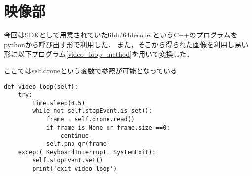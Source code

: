 \section{映像部}
\label{implement_video}
今回はSDK\cite{tellosdk}として用意されていたlibh264decoderというC++のプログラムをpythonから呼び出す形で利用した．
また，そこから得られた画像を利用し易い形に以下プログラム\ref{video_loop_method}を用いて変換した．

ここではself.droneという変数で参照が可能となっている
\begin{lstlisting}[caption=video loop method,label=video_loop_method]
def video_loop(self):
    try: 
        time.sleep(0.5)
        while not self.stopEvent.is_set():                
            frame = self.drone.read()
            if frame is None or frame.size ==0:
                continue
            self.pnp_qr(frame)
    except( KeyboardInterrupt, SystemExit):
        self.stopEvent.set()
        print('exit video loop')
\end{lstlisting}
